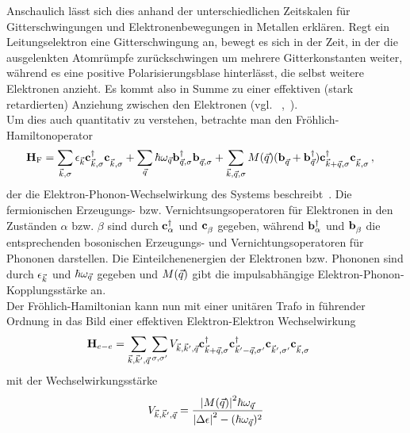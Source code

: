 Anschaulich lässt sich dies anhand der unterschiedlichen Zeitskalen für Gitterschwingungen und Elektronenbewegungen in Metallen erklären.
Regt ein Leitungselektron eine Gitterschwingung an, bewegt es sich in der Zeit, in der die ausgelenkten Atomrümpfe zurückschwingen um mehrere Gitterkonstanten weiter, während es eine positive Polarisierungsblase hinterlässt, die selbst weitere Elektronen anzieht. 
Es kommt also in Summe zu einer effektiven (stark retardierten) Anziehung zwischen den Elektronen (vgl. ~\cite[218]{czycholl_theoretische_2017},~\cite[266]{altland_condensed_2012}). \\
Um dies auch quantitativ zu verstehen, betrachte man den Fröhlich-Hamiltonoperator 
\begin{align}
    \oH_{\text{F}} &= \sum_{\vk, \sigma} \epsilon_\vk \ofed{\vk, \sigma} \ofe{\vk, \sigma} + \sum_{\vq} \hbar \omega_{\vq} \op{b}^{\dagg}_{\vq, \sigma} \op{b}^{\pdagg}_{\vq, \sigma} + \sum_{\vk, \vq, \sigma} M(\vq) ( \obo{\vq} + \obod{\vq}) \ofed{\vk + \vq, \sigma} \ofe{\vk, \sigma} \, ,
\end{align}
der die Elektron-Phonon-Wechselwirkung des Systems beschreibt~\cite{czycholl_theoretische_2017}. 
Die fermionischen Erzeugungs- bzw. Vernichtsungsoperatoren für Elektronen in den Zuständen $\alpha$ bzw. $\beta$ sind durch $\mathbf{c}^{\dagger}_{\alpha}$ und $\ofe{\beta}$ gegeben, während $\mathbf{b}^{\dagger}_{\alpha}$ und $\obo{\beta}$ die entsprechenden bosonischen Erzeugungs- und Vernichtungsoperatoren für Phononen darstellen.
Die Einteilchenenergien der Elektronen bzw. Phononen sind durch $\epsilon_{\vec{k}}$ und $\hbar \omega_{\vec{q}}$ gegeben und $M({\vec{q}})$ gibt die impulsabhängige Elektron-Phonon-Kopplungsstärke an. \\
Der Fröhlich-Hamiltonian kann nun mit einer unitären Trafo in führender Ordnung in das Bild einer effektiven Elektron-Elektron Wechselwirkung 
\begin{align}
    \oH_{e-e} &= \sum_{\vk, \vec{k}', \vq}\sum_{\sigma, \sigma'} V_{\vk, \vec{k}', \vq} \ofed{\vk + \vq, \sigma} \ofed{\vec{k}' - \vq, \sigma'} \ofe{\vec{k}', \sigma'} \ofe{\vk, \sigma}~\label{eq:H_ee}
\end{align}
mit der Wechselwirkungsstärke 
\begin{align}
    V_{{\vec{k}}, \vec{k}', {\vec{q}}} = \frac{\abs{M({\vec{q}})}^2 \hbar \omega_{\vec{q}}}{\abs{\Delta \epsilon}^2 - (\hbar \omega_{\vec{q}})^2}
\end{align}
